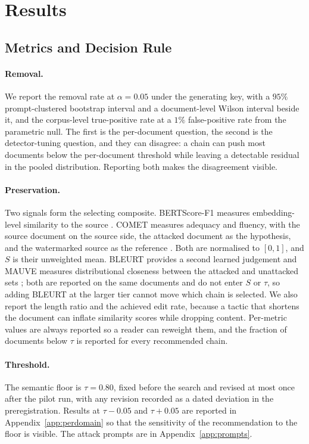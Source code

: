 \section{Results}
\label{sec:results}

\subsection{Metrics and Decision Rule}
\label{sec:metrics}

\paragraph{Removal.}
We report the removal rate at $\alpha = 0.05$ under the generating key, with a $95\%$ prompt-clustered bootstrap interval and a document-level Wilson interval beside it, and the corpus-level true-positive rate at a $1\%$ false-positive rate from the parametric null. The first is the per-document question, the second is the detector-tuning question, and they can disagree: a chain can push most documents below the per-document threshold while leaving a detectable residual in the pooled distribution. Reporting both makes the disagreement visible.

\paragraph{Preservation.}
Two signals form the selecting composite. BERTScore-F1 measures embedding-level similarity to the source \citep{bertscore}. COMET measures adequacy and fluency, with the source document on the source side, the attacked document as the hypothesis, and the watermarked source as the reference \citep{comet}. Both are normalised to $[0,1]$, and $S$ is their unweighted mean. BLEURT provides a second learned judgement \citep{bleurt} and MAUVE measures distributional closeness between the attacked and unattacked sets \citep{mauve}; both are reported on the same documents and do not enter $S$ or $\tau$, so adding BLEURT at the larger tier cannot move which chain is selected. We also report the length ratio and the achieved edit rate, because a tactic that shortens the document can inflate similarity scores while dropping content. Per-metric values are always reported so a reader can reweight them, and the fraction of documents below $\tau$ is reported for every recommended chain.

\paragraph{Threshold.}
The semantic floor is $\tau = 0.80$, fixed before the search and revised at most once after the pilot run, with any revision recorded as a dated deviation in the preregistration. Results at $\tau - 0.05$ and $\tau + 0.05$ are reported in Appendix~\ref{app:perdomain} so that the sensitivity of the recommendation to the floor is visible. The attack prompts are in Appendix~\ref{app:prompts}.

